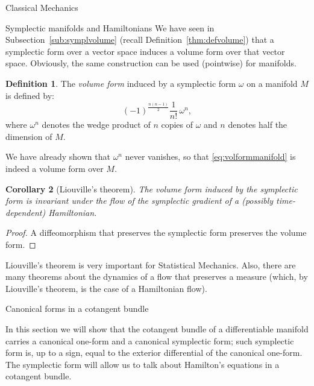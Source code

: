 \documentclass[oneside,a4paper,11pt]{amsbook}
\theoremstyle{remark}\newtheorem{exercise}{Exercise}[chapter]
\theoremstyle{plain}\newtheorem{teo}{Theorem}[section]
\theoremstyle{plain}\newtheorem{lem}[teo]{Lemma}
\theoremstyle{plain}\newtheorem{prop}[teo]{Proposition}
\theoremstyle{plain}\newtheorem{cor}[teo]{Corollary}
\theoremstyle{definition}\newtheorem{defin}[teo]{Definition}
\theoremstyle{remark}\newtheorem{rem}[teo]{Remark}
\theoremstyle{definition}\newtheorem{notation}[teo]{Notation}
\theoremstyle{definition}\newtheorem{convention}[teo]{Convention}
\theoremstyle{definition}\newtheorem{example}[teo]{Example}
\numberwithin{section}{chapter}
\numberwithin{equation}{section}
\begin{document}
\begin{chapter}{Classical Mechanics}
\begin{section}{Symplectic manifolds and Hamiltonians}
We have seen in Subsection~\ref{sub:symplvolume} (recall Definition~\ref{thm:defvolume}) that a symplectic form over a vector space induces a volume form over that vector
space. Obviously, the same construction can be used (pointwise) for manifolds.
\begin{defin}
The {\em volume form\/} induced by a symplectic form $\omega$ on a manifold $M$ is defined by:
\begin{equation}\label{eq:volformmanifold}
(-1)^{\frac{n(n-1)}2}\frac1{n!}\,\omega^n,
\end{equation}
where $\omega^n$ denotes the wedge product of $n$ copies of $\omega$ and $n$ denotes half the dimension of $M$.
\end{defin}
We have already shown that $\omega^n$ never vanishes, so that \eqref{eq:volformmanifold} is indeed a volume
form over $M$.

\begin{cor}[Liouville's theorem]\label{thm:corLiouville}
The volume form induced by the symplectic form is invariant under the flow of the symplectic gradient
of a (possibly time-dependent) Hamiltonian.
\end{cor}
\begin{proof}
A diffeomorphism that preserves the symplectic form preserves the volume form.
\end{proof}

Liouville's theorem is very important for Statistical Mechanics. Also, there are many theorems about the dynamics of a flow that preserves a measure
(which, by Liouville's theorem, is the case of a Hamiltonian flow).

\end{section}

\begin{section}{Canonical forms in a cotangent bundle}
\label{sec:canformscot}

In this section we will show that the cotangent bundle of a differentiable manifold carries a canonical one-form
and a canonical symplectic form; such symplectic form is, up to a sign, equal to the exterior differential of the canonical one-form.
The symplectic form will allow us to talk about Hamilton's equations in a cotangent bundle.


\end{section}
\end{chapter}
\end{document}
